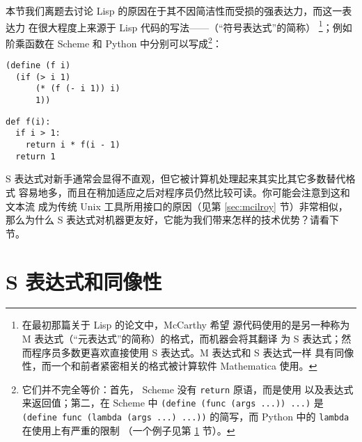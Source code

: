 本节我们离题去讨论 Lisp 的原因在于其不因简洁性而受损的强表达力，而这一表达力
在很大程度上来源于 Lisp 代码的写法——（“符号表达式”的简称）%
\footnote{在最初那篇关于 Lisp 的论文中，McCarthy 希望
源代码使用的是另一种称为 M 表达式（“元表达式”的简称）的格式，而机器会将其翻译
为 S 表达式；然而程序员多数更喜欢直接使用 S 表达式。M 表达式和 S 表达式一样
具有同像性，而一个和前者紧密相关的格式被计算软件 Mathematica 使用。}；例如
阶乘函数在 Scheme 和 Python 中分别可以写成\footnote{它们并不完全等价：首先，%
Scheme 没有 \texttt{return} 原语，而是使用%
以及表达式来返回值；第二，在 Scheme 中 \texttt{(define (func
(args ...)) ...)} 是 \texttt{(define func (lambda (args ...) ...))}
的简写，而 Python 中的 \texttt{lambda} 在使用上有严重的限制
（一个例子见第 \ref{sec:homoiconic} 节）。}：
\colskipa\begin{multicols}{2}
\begin{quoting}
\begin{Verbatim}
(define (f i)
  (if (> i 1)
      (* (f (- i 1)) i)
      1))
\end{Verbatim}
\end{quoting}
\begin{quoting}
\begin{Verbatim}
def f(i):
  if i > 1:
    return i * f(i - 1)
  return 1
\end{Verbatim}
\end{quoting}
\end{multicols}\colskipb\noindent%
S 表达式对新手通常会显得不直观，但它被计算机处理起来其实比其它多数替代格式
容易地多，而且在稍加适应之后对程序员仍然比较可读。你可能会注意到这和文本流
成为传统 Unix 工具所用接口的原因（见第 \ref{sec:mcilroy} 节）非常相似，
那么为什么 S 表达式对机器更友好，它能为我们带来怎样的技术优势？请看下节。

\newpart
\section{S 表达式和同像性}\label{sec:homoiconic}

